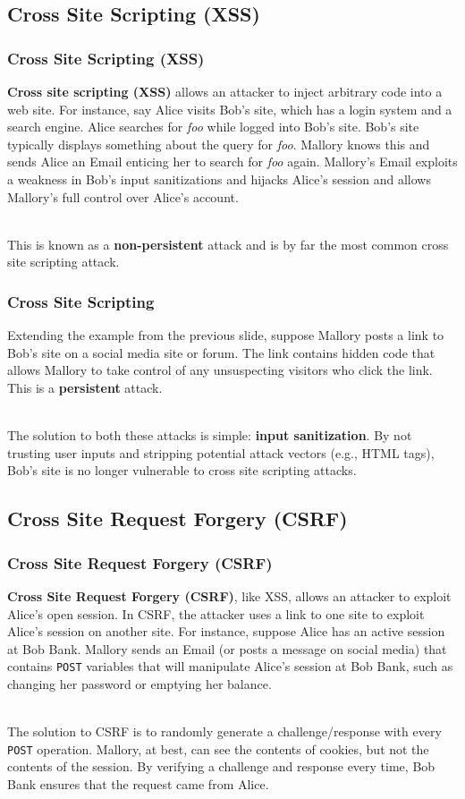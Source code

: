 \documentclass[aspectratio=169]{beamer}
\begin{document}
\subsection{Cross Site Scripting (XSS)}
\begin{frame}
\frametitle{Cross Site Scripting (XSS)}
\textbf{Cross site scripting (XSS)} allows an attacker to inject arbitrary code into a web site. For instance, say Alice visits Bob's site, which has a login system and a search engine. Alice searches for \textit{foo} while logged into Bob's site. Bob's site typically displays something about the query for \textit{foo}. Mallory knows this and sends Alice an Email enticing her to search for \textit{foo} again. Mallory's Email exploits a weakness in Bob's input sanitizations and hijacks Alice's session and allows Mallory's full control over Alice's account.

\mbox{}\\
This is known as a \textbf{non-persistent} attack and is by far the most common cross site scripting attack.
\end{frame}

\begin{frame}
\frametitle{Cross Site Scripting}
Extending the example from the previous slide, suppose Mallory posts a link to Bob's site on a social media site or forum. The link contains hidden code that allows Mallory to take control of any unsuspecting visitors who click the link. This is a \textbf{persistent} attack.

\pause
\mbox{}\\
The solution to both these attacks is simple: \textbf{input sanitization}. By not trusting user inputs and stripping potential attack vectors (e.g., HTML tags), Bob's site is no longer vulnerable to cross site scripting attacks.
\end{frame}

\subsection{Cross Site Request Forgery (CSRF)}
\begin{frame}
\frametitle{Cross Site Request Forgery (CSRF)}
\textbf{Cross Site Request Forgery (CSRF)}, like XSS, allows an attacker to exploit Alice's open session. In CSRF, the attacker uses a link to one site to exploit Alice's session on another site. For instance, suppose Alice has an active session at Bob Bank. Mallory sends an Email (or posts a message on social media) that contains \texttt{POST} variables that will manipulate Alice's session at Bob Bank, such as changing her password or emptying her balance.

\pause
\mbox{}\\
The solution to CSRF is to randomly generate a challenge/response with every \texttt{POST} operation. Mallory, at best, can see the contents of cookies, but not the contents of the session. By verifying a challenge and response every time, Bob Bank ensures that the request came from Alice.
\end{frame}
\end{document}
